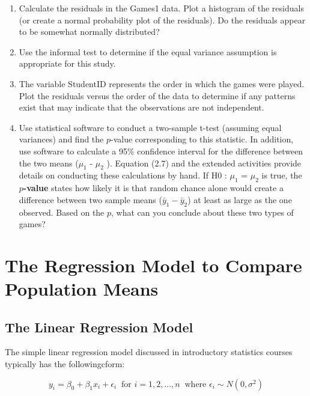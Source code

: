 \documentclass[
]{report}
\providecommand{\tightlist}{%
  \setlength{\itemsep}{0pt}\setlength{\parskip}{0pt}}
\theoremstyle{definition}
\theoremstyle{definition}
\theoremstyle{definition}
\theoremstyle{definition}
\theoremstyle{remark}
\begin{document}
\begin{enumerate}
\def\labelenumi{\arabic{enumi}.}
\setcounter{enumi}{6}
\tightlist
\item
  Calculate the residuals in the Games1 data. Plot a histogram of the residuals (or create a normal probability plot of the residuals). Do the residuals appear to be somewhat normally distributed?
\item
  Use the informal test to determine if the equal variance assumption is appropriate for this study.
\item
  The variable StudentID represents the order in which the games were played. Plot the residuals versus the order of the data to determine if any patterns exist that may indicate that the observations are
  not independent.
\item
  Use statistical software to conduct a two-sample t-test (assuming equal variances) and find the \(p\)-value corresponding to this statistic. In addition, use software to calculate a 95\% confidence interval for
  the difference between the two means (\(\mu_1\) - \(\mu_2\) ). Equation (2.7) and the extended activities provide details on conducting these calculations by hand. If H0 : \(\mu_1\) = \(\mu_2\) is true, the \textbf{\(p\)-value} states how likely it is that random chance alone would create a difference between two sample means (\(\bar{y}_1 - \bar{y}_2\)) at least as large as the one observed. Based on the \(p\), what can you conclude about these two types of
  games?
\end{enumerate}

\newpage

\hypertarget{the-regression-model-to-compare-population-means}{%
\section{The Regression Model to Compare Population Means}\label{the-regression-model-to-compare-population-means}}

\hypertarget{the-linear-regression-model}{%
\subsection{The Linear Regression Model}\label{the-linear-regression-model}}

The simple linear regression model discussed in introductory statistics courses typically has the followingcform:

\begin{equation}
y_i = \beta_0 + \beta_1x_i + \epsilon_i ~\text{ for } i = 1, 2, ... , n ~\text{ where } \epsilon_i \sim N(0,\sigma^2)
\tag{2.2}
\end{equation}
\end{document}
